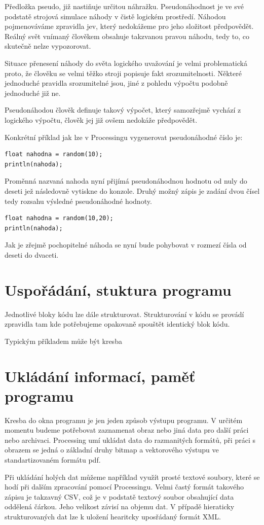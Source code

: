 \documentclass[11pt]{book}
\newcommand{\oddil}[1]{\section{#1}\label{sec:#1}}
\begin{document}
Předložka pseudo, již nastiňuje určitou náhražku. Pseudonáhodnost je ve své podstatě strojová simulace náhody v čistě logickém prostředí. Náhodou pojmenováváme zpravidla jev, který nedokážeme pro jeho složitost předpovědět. Reálný svět vnímaný člověkem obsahuje takzvanou pravou náhodu, tedy to, co skutečně nelze vypozorovat.

Situace přenesení náhody do světa logického uvažování je velmi problematická proto, že člověku se velmi těžko stroji popisuje fakt srozumitelnosti. Některé jednoduché pravidla srozumitelné jsou, jiné z pohledu výpočtu podobně jednoduché již ne.

Pseudonáhodou člověk definuje takový výpočet, který samozřejmě vychází z logického výpočtu, člověk jej již ovšem nedokáže předpovědět.

Konkrétní příklad jak lze v Processingu vygenerovat pseudonáhodné číslo je:

\begin{lstlisting}
float nahodna = random(10);
println(nahoda);
\end{lstlisting}

Proměnná nazvaná nahoda nyní přijímá pseudonáhodnou hodnotu od nuly do deseti jež následovně vytiskne do konzole. Druhý možný zápis je zadání dvou čísel tedy rozsahu výsledné pseudonáhodné hodnoty.


\begin{lstlisting}
float nahodna = random(10,20);
println(nahoda);
\end{lstlisting}

Jak je zřejmě pochopitelné náhoda se nyní bude pohybovat v rozmezí čísla od deseti do dvaceti.


\oddil{Uspořádání, stuktura programu}

Jednotlivé bloky kódu lze dále strukturovat. Strukturování v kódu se provádí zpravidla tam kde potřebujeme opakovaně spouštět identický blok kódu.

Typickým příkladem může být kresba 

\oddil{Ukládání informací, paměť programu}

Kresba do okna programu je jen jeden způsob výstupu programu. V určitém momentu budeme potřebovat zaznamenat obraz nebo jiná data pro další práci nebo archivaci. Processing umí ukládat data do razmanitých formátů, při práci s obrazem se jedná o základní druhy bitmap a vektorového výstupu ve standartizovaném formátu pdf.

Při ukládání holých dat můžeme například využít prosté textové soubory, které se hodí při dalším zpracování pomocí Processingu. Velmi častý formát takového zápisu je takzavný CSV, což je v podstatě textový soubor obsahující data oddělená čárkou. Jeho velikost závisí na objemu dat. V případě hieraticky strukturovaných dat lze k uložení hearitcky uposřádaný formát XML.
\end{document}
